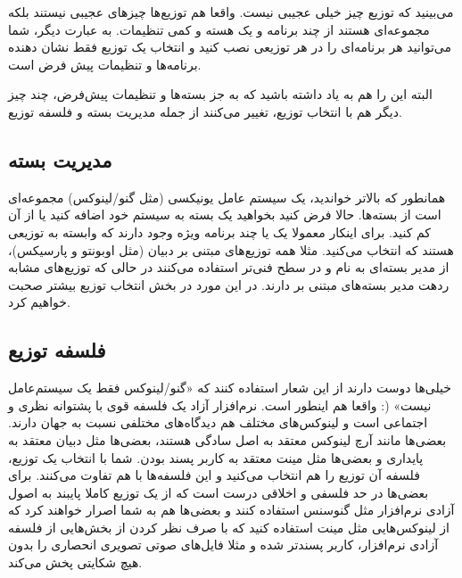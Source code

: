 می‌بینید که توزیع چیز خیلی عجیبی نیست. واقعا هم توزیع‌ها چیزهای عجیبی نیستند بلکه مجموعه‌ای هستند از چند برنامه و یک هسته و کمی تنظیمات. به عبارت دیگر، شما می‌توانید هر برنامه‌ای را در هر توزیعی نصب کنید و انتخاب یک توزیع فقط نشان دهنده برنامه‌ها و تنظیمات پیش فرض است.
	
البته این را هم به یاد داشته باشید که به جز بسته‌ها و تنظیمات پیش‌فرض، چند چیز دیگر هم با انتخاب توزیع، تغییر می‌کنند از جمله مدیریت بسته و فلسفه توزیع.
\subsection*{مدیریت بسته}
همانطور که بالاتر خواندید، یک سیستم عامل یونیکسی (مثل گنو/لینوکس) مجموعه‌ای است از بسته‌ها. حالا فرض کنید بخواهید یک بسته به سیستم خود اضافه کنید یا از آن کم کنید. برای اینکار معمولا یک یا چند برنامه ویژه وجود دارند که وابسته به توزیعی هستند که انتخاب می‌کنید. مثلا همه توزیع‌های مبتنی بر دبیان (مثل اوبونتو و پارسیکس)، از مدیر بسته‌ای به نام 
 و در سطح فنی‌تر 
 استفاده می‌کنند در حالی که توزیع‌های مشابه ردهت مدیر بسته‌های مبتنی بر 
 دارند. در این مورد در بخش انتخاب توزیع بیشتر صحبت خواهیم کرد.
\subsection*{فلسفه توزیع}
خیلی‌ها دوست دارند از این شعار استفاده کنند که «گنو/لینوکس فقط یک سیستم‌عامل نیست» (: واقعا هم اینطور است. نرم‌افزار آزاد یک فلسفه قوی با پشتوانه نظری و اجتماعی است و لینوکس‌های مختلف هم دیدگاه‌های مختلفی نسبت به جهان دارند. بعضی‌ها مانند آرچ لینوکس معتقد به اصل سادگی هستند،‌ بعضی‌ها مثل دبیان معتقد به پایداری و بعضی‌ها مثل مینت معتقد به کاربر پسند بودن. شما با انتخاب یک توزیع، فلسفه آن توزیع را هم انتخاب می‌کنید و این فلسفه‌ها با هم تفاوت می‌کنند.
برای بعضی‌ها در حد فلسفی و اخلاقی درست است که از یک توزیع کاملا پایبند به اصول آزادی نرم‌افزار مثل گنوسنس استفاده کنند و بعضی‌ها هم به شما اصرار خواهند کرد که از لینوکس‌هایی مثل مینت استفاده کنید که با صرف نظر کردن از بخش‌هایی از فلسفه آزادی نرم‌افزار، کاربر پسندتر شده و مثلا فایل‌های صوتی تصویری انحصاری را بدون هیچ شکایتی پخش می‌کند.
